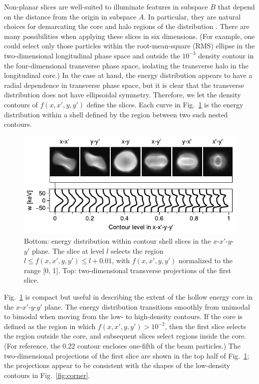 \documentclass[%
 reprint,
 amsmath,amssymb,
 aps,
prstab,
]{revtex4-2}
\begin{document}
Non-planar slices are well-suited to illuminate features in subspace $B$ that depend on the distance from the origin in subspace $A$. In particular, they are natural choices for demarcating the core and halo regions of the distribution \cite{Aleksandrov2016-IPAC}. There are many possibilities when applying these slices in six dimensions. (For example, one could select only those particles within the root-mean-square (RMS) ellipse in the two-dimensional longitudinal phase space and outside the $10^{-3}$ density contour in the four-dimensional transverse phase space, isolating the transverse halo in the longitudinal core.) In the case at hand, the energy distribution appears to have a radial dependence in transverse phase space, but it is clear that the transverse distribution does not have ellipsoidal symmetry. Therefore, we let the density contours of $f(x, x', y, y')$ define the slices. Each curve in Fig.~\ref{fig:hollow_energy_b} is the energy distribution within a shell defined by the region between two such nested contours.
%
\begin{figure}[]
    \centering
    \includegraphics[width=\columnwidth]{fig_shell_slice.pdf}
    \caption{Bottom: energy distribution within contour shell slices in the $x$-$x'$-$y$-$y'$ plane. The slice at level $l$ selects the region $l \le f(x, x', y, y') \le l + 0.01$, with $f(x, x', y, y')$ normalized to the range [0, 1]. Top: two-dimensional transverse projections of the first slice.}
    \label{fig:hollow_energy_b}
\end{figure}
%

Fig.~\ref{fig:hollow_energy_b} is compact but useful in describing the extent of the hollow energy core in the $x$-$x'$-$y$-$y'$ plane. The energy distribution transitions smoothly from unimodal to bimodal when moving from the low- to high-density contours. If the core is defined as the region in which $f(x, x', y, y') > 10^{-2}$, then the first slice selects the region outside the core, and subsequent slices select regions inside the core. (For reference, the 0.22 contour encloses one-fifth of the beam particles.) The two-dimensional projections of the first slice are shown in the top half of Fig.~\ref{fig:hollow_energy_b}; the projections appear to be consistent with the shapes of the low-density contours in Fig.~\ref{fig:corner}.
\end{document}

